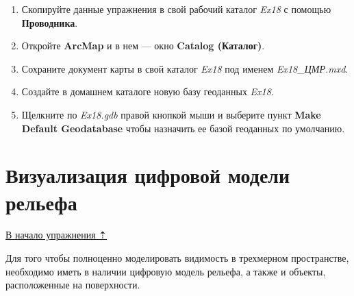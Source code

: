 \documentclass[]{book}
\theoremstyle{definition}
\theoremstyle{definition}
\theoremstyle{definition}
\theoremstyle{remark}
\begin{document}
\begin{enumerate}
\def\labelenumi{\arabic{enumi}.}
\item
  Скопируйте данные упражнения в свой рабочий каталог \emph{Ex18} с
  помощью \textbf{Проводника}.
\item
  Откройте \textbf{ArcMap} и в нем --- окно \textbf{Catalog (Каталог)}.
\item
  Сохраните документ карты в свой каталог \emph{Ex18} под именем
  \emph{Ex18\_ЦМР.mxd}.
\item
  Создайте в домашнем каталоге новую базу геоданных \emph{Ex18}.
\item
  Щелкните по \emph{Ex18.gdb} правой кнопкой мыши и выберите пункт
  \textbf{Make Default Geodatabase} чтобы назначить ее базой геоданных
  по умолчанию.
\end{enumerate}

\hypertarget{threed-modelling-demviz}{%
\section{Визуализация цифровой модели
рельефа}\label{threed-modelling-demviz}}

\protect\hyperlink{threed-modelling}{В начало упражнения ⇡}

Для того чтобы полноценно моделировать видимость в трехмерном
пространстве, необходимо иметь в наличии цифровую модель рельефа, а
также и объекты, расположенные на поверхности.
\end{document}
